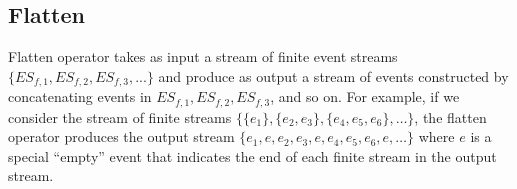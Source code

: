 \subsection{Flatten}
 Flatten operator takes as input a stream of finite event streams $\{ES_{f,1}, ES_{f,2}, ES_{f,3}, ...\}$  and produce as output a stream of events constructed by concatenating events in $ES_{f,1}, ES_{f,2}, ES_{f,3}$, and so on. 
For example, if we consider the stream of finite streams $\{\{e_1\}, \{e_2, e_3\}, \{e_4, e_5, e_6\}, …\}$, the flatten operator produces the output stream $\{e_1, e, e_2, e_3,e, e_4, e_5, e_6, e, …\}$ where $e$ is a special “empty” event that indicates the end of each finite stream in the output stream.


